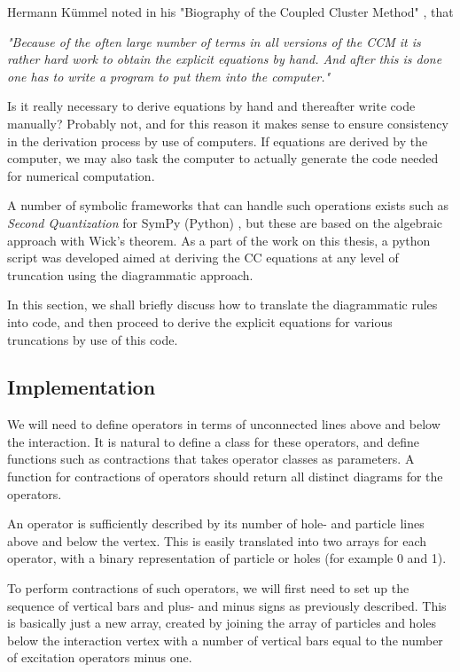 Hermann Kümmel noted in his "Biography of the Coupled Cluster Method"
\cite{Kummel}, that

\emph{"Because of the often large number of terms in all versions of the CCM it is rather hard work to obtain the explicit equations by hand. And after this is done one has to write a program to put them into the computer."}

Is it really necessary to derive equations by hand and thereafter
write code manually? Probably not, and for this reason it makes sense
to ensure consistency in the derivation process by use of
computers. If equations are derived by the computer, we may also task
the computer to actually generate the code needed for numerical
computation.

A number of symbolic frameworks that can handle such operations
exists such as \emph{Second Quantization} for SymPy (Python)
\cite{secondquant}, but these are based on the algebraic approach with
Wick's theorem. As a part of the work on this thesis, a python script
was developed aimed at deriving the CC equations at any level of truncation
using the diagrammatic approach.

In this section, we shall briefly discuss how to translate the
diagrammatic rules into code, and then proceed to derive the explicit
equations for various truncations by use of this code.

\subsection{Implementation}

We will need to define operators in terms of unconnected lines above
and below the interaction. It is natural to define a class for these
operators, and define functions such as contractions that takes
operator classes as parameters. A function for contractions of
operators should return all distinct diagrams for the operators.

An operator is sufficiently described by its number of hole- and
particle lines above and below the vertex. This is easily translated
into two arrays for each operator, with a binary representation of
particle or holes (for example 0 and 1).

To perform contractions of such operators, we will first need to set up the sequence of vertical bars and plus- and minus signs as previously described. This is basically just a new array, created by joining the array of particles and holes below the interaction vertex with a number of vertical bars equal to the number of excitation operators minus one.

